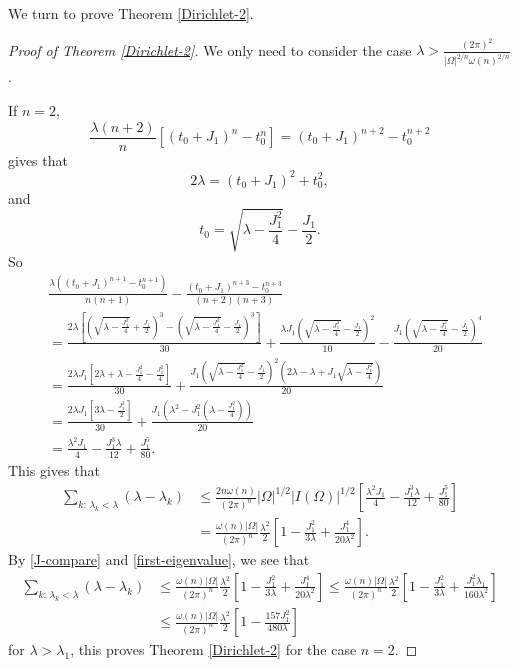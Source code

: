 \documentclass[11pt,twoside, leqno]{article}
\numberwithin{equation}{section}
\begin{document}
We turn to prove Theorem \ref{Dirichlet-2}.
\begin{proof}[Proof of Theorem \ref{Dirichlet-2}]
We only need to consider the case $\lambda>\frac{(2\pi)^2}{|\Omega|^{2/n}\omega(n)^{2/n}}$.

If $n=2$,
$$\frac{\lambda (n+2)}{n} [(t_0+J_1)^{n}-t_0^{n}] = (t_0+J_1)^{n+2}-t_0^{n+2}$$
gives that
$$2\lambda= (t_0+J_1)^{2}+t_0^{2},$$
and
$$t_0=\sqrt{\lambda-\frac{J_1^2}{4}}-\frac{J_1}{2}.$$
So
\begin{align*}
 &\frac{\lambda ((t_0+J_1)^{n+1}-t_0^{n+1})}{n(n+1)}-\frac{(t_0+J_1)^{n+3}-t_0^{n+3}}{(n+2)(n+3)}\nonumber\\
  &=\frac{2\lambda \left[(\sqrt{\lambda-\frac{J_1^2}{4}}+\frac{J_1}{2})^{3}-(\sqrt{\lambda-\frac{J_1^2}{4}}-\frac{J_1}{2})^{3} \right] }{30}+\frac{\lambda J_1 (\sqrt{\lambda-\frac{J_1^2}{4}}-\frac{J_1}{2})^{2} }{{10}}-\frac{J_1  (\sqrt{\lambda-\frac{J_1^2}{4}}-\frac{J_1}{2})^{4}}{20}\\
  &=\frac{ 2\lambda J_1 \left[ 2\lambda+\lambda -\frac{J_1^2}{4}-\frac{J_1^2}{4}\right]  }{30}+\frac{J_1 (\sqrt{\lambda-\frac{J_1^2}{4}}-\frac{J_1}{2})^{2}  (2\lambda- \lambda+ J_1\sqrt{\lambda-\frac{J_1^2}{4}})}{20}\\
  &= \frac{ 2\lambda J_1 \left[ 3\lambda -\frac{J_1^2}{2}\right]  }{30}+\frac{J_1 ( \lambda^2-J_1^2 (\lambda-\frac{J_1^2}{4}))}{20}\\
  &=\frac{\lambda^2 J_1}{4}-\frac{J_1^3\lambda }{12}+\frac{J_1^5}{80}.
\end{align*}
This gives that
\begin{align}\label{est-21}
\sum_{k:\,\lambda_k<\lambda}(\lambda-\lambda_k)&\le   \frac{2n\omega(n)}{(2\pi)^{n}} |\Omega|^{1/2}|I(\Omega)|^{1/2}    \left[\frac{\lambda^2 J_1}{4}-\frac{J_1^3\lambda }{12}+\frac{J_1^5}{80}\right]\nonumber\\
&=\frac{\omega(n) |\Omega|}{(2\pi)^{n}} \frac{\lambda^2 }{2} \left[1- \frac{J_1^2 }{3\lambda}+\frac{J_1^4 }{20 \lambda^2}\right].
\end{align}
By \eqref{J-compare} and \eqref{first-eigenvalue}, we see that
\begin{align*}
\sum_{k:\,\lambda_k<\lambda}(\lambda-\lambda_k)&\le \frac{\omega(n) |\Omega|}{(2\pi)^{n}} \frac{\lambda^2 }{2} \left[1- \frac{J_1^2 }{3\lambda}+\frac{J_1^4 }{20 \lambda^2}\right]\le \frac{\omega(n) |\Omega|}{(2\pi)^{n}} \frac{\lambda^2 }{2} \left[1- \frac{J_1^2 }{3\lambda}+\frac{J_1^2\lambda_1 }{160 \lambda^2}\right]\\
&\le \frac{\omega(n) |\Omega|}{(2\pi)^{n}} \frac{\lambda^2 }{2} \left[1- \frac{157 J_1^2  }{480 \lambda}\right]
\end{align*}
for $\lambda>\lambda_1$, this proves Theorem \ref{Dirichlet-2} for the case $n=2$.





\end{proof}
\end{document}
